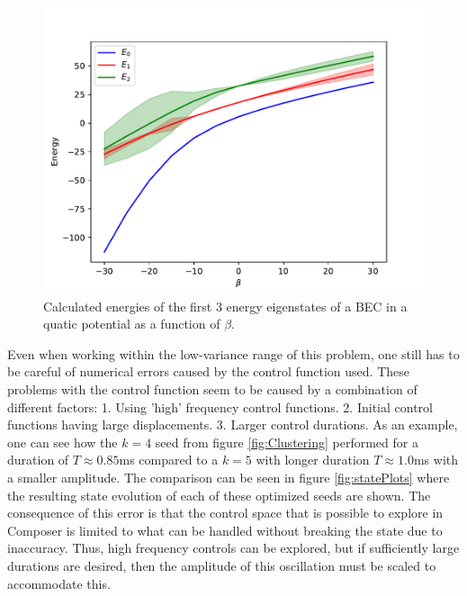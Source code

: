 \documentclass[aps,pra,reprint,superscriptaddress]{revtex4-1}
\begin{document}
\begin{figure}
	\includegraphics[width=\columnwidth]{graphics/Energylevels.pdf}
	\caption{Calculated energies of the first 3 energy eigenstates of a BEC in a quatic potential as a function of $\beta$.}
	\label{fig:energyLevels}
\end{figure}

Even when working within the low-variance range of this problem, one still has to be careful of numerical errors caused by the control function used. These problems with the control function seem to be caused by a combination of different factors: 1. Using 'high' frequency control functions. 2. Initial control functions having large displacements. 3. Larger control durations. As an example, one can see how the $k=4$ seed from figure \ref{fig:Clustering} performed for a duration of $T\approx 0.85$ms compared to a $k=5$ with longer duration  $T\approx 1.0$ms with a smaller amplitude. The comparison can be seen in figure \ref{fig:statePlots} where the resulting state evolution of each of these optimized seeds are shown. The consequence of this error is that the control space that is possible to explore in Composer is limited to what can be handled without breaking the state due to inaccuracy. Thus, high frequency controls can be explored, but if sufficiently large durations are desired, then the amplitude of this oscillation must be scaled to accommodate this.
\end{document}
